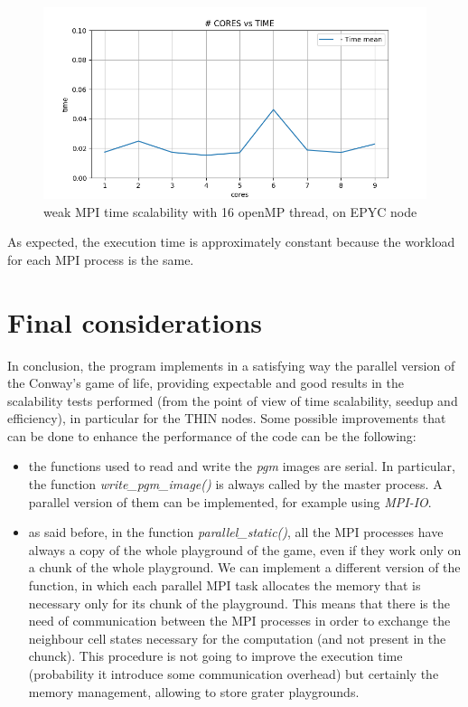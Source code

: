 \documentclass[12pt, titlepage]{report}
\begin{document}
\begin{figure}[H]
	\centering
	\includegraphics[width=\textwidth]{Assignment-1/MPI_W-scalability_static-ev_16omp-threds_time.png}
	\caption{weak MPI time scalability with 16 openMP thread, on EPYC node}
\end{figure}
As expected, the execution time is approximately constant because the workload for each MPI process is the same. 

\section{Final considerations}\label{Final}
In conclusion, the program implements in a satisfying way the parallel version of the Conway's game of life, providing expectable and good results
in the scalability tests performed (from the point of view of time scalability, seedup and efficiency), in particular for the THIN nodes. Some possible
improvements that can be done to enhance the performance of the code can be the following:
\begin{itemize}
	\item the functions used to read and write the \emph{pgm} images are serial. In particular, the function \emph{write\_pgm\_image()} is always called 
	by the master process. A parallel version of them can be implemented, for example using \emph{MPI-IO}.
	\item as said before, in the function \emph{parallel\_static()}, all the MPI processes have always a copy of the whole playground of the game, 
	even if they work only on a chunk of the whole playground. We can implement a different version of the function, in which each parallel MPI task
	allocates the memory that is necessary only for its chunk of the playground. This means that there is the need of communication between the MPI 
	processes in order to exchange the neighbour cell states necessary for the computation (and not present in the chunck). This procedure is not going
	to improve the execution time (probability it introduce some communication overhead) but certainly the memory management, allowing to store grater 
	playgrounds. 
\end{itemize}
\end{document}
